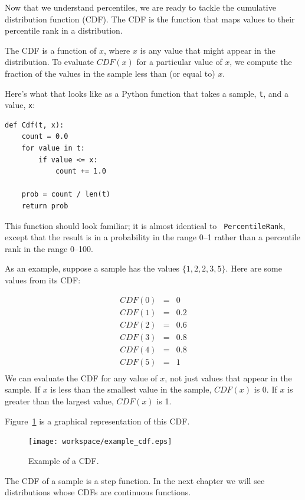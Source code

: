 \documentclass[12pt]{book}
\begin{document}
Now that we understand percentiles, we are ready to tackle the
cumulative distribution function (CDF).  The CDF is the function that
maps values to their percentile rank in a distribution.

The CDF is a function of $x$, where $x$ is any value that might appear
in the distribution.  To evaluate $CDF(x)$ for a particular value of
$x$, we compute the fraction of the values in the sample less than (or
equal to) $x$.

Here's what that looks like as a Python function that takes a sample,
{\tt t}, and a value, {\tt x}:

\begin{verbatim}
def Cdf(t, x):
    count = 0.0
    for value in t:
        if value <= x:
            count += 1.0

    prob = count / len(t)
    return prob
\end{verbatim}

This function should look familiar; it is almost identical to {\tt
  PercentileRank}, except that the result is in a probability in the
range 0--1 rather than a percentile rank in the range 0--100.

As an example, suppose a sample has the values $\{1, 2, 2, 3, 5\}$.
Here are some values from its CDF:

\begin{eqnarray*}
CDF(0) &=& 0    \\
CDF(1) &=& 0.2    \\
CDF(2) &=& 0.6    \\
CDF(3) &=& 0.8    \\
CDF(4) &=& 0.8    \\
CDF(5) &=& 1    \\
\end{eqnarray*}
%
We can evaluate the CDF for any value of $x$, not just
values that appear in the sample.
If $x$ is less than the smallest value in the sample, $CDF(x)$ is 0.
If $x$ is greater than the largest value, $CDF(x)$ is 1.

Figure~\ref{example_cdf} is a graphical representation of this CDF.

\begin{figure}
\centerline{\texttt{[image: workspace/example\_cdf.eps]}}
\caption{Example of a CDF.}
\label{example_cdf}
\end{figure}

The CDF of a sample is a step function.  In the next chapter we
will see distributions whose CDFs are continuous functions.  
\end{document}
